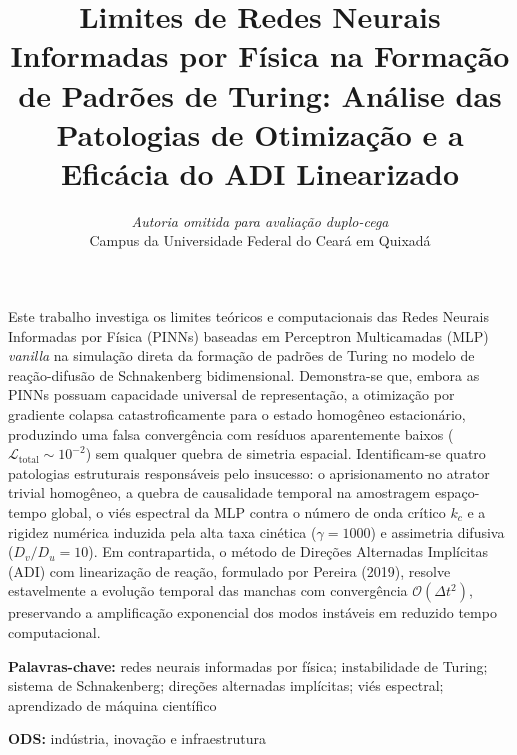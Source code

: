 \documentclass[a4paper, 12pt, twoside]{article}
\title{\textbf{Limites de Redes Neurais Informadas por Física na Formação de Padrões
       de Turing: Análise das Patologias de Otimização e a Eficácia do ADI Linearizado}}
\author{%
  \textit{Autoria omitida para avaliação duplo-cega}\\[0.2em]
  \small Campus da Universidade Federal do Ceará em Quixadá
}
\date{}
\renewcommand{\qabstract}[6]{%
  \vspace{0.35em}%
  \noindent{\normalfont\normalsize\bfseries\MakeUppercase{#1}}\par%
  \vspace{0.15em}%
  \noindent #4\par%
  \vspace{0.25em}%
  \noindent\textbf{#2:} #5\par%
  \vspace{0.15em}%
  \noindent\textbf{#3:} #6\par%
  \vspace{0.5em}%
}
\begin{document}
\maketitle
\thispagestyle{plain}


\qabstract{Resumo}{Palavras-chave}{ODS}{%
Este trabalho investiga os limites teóricos e computacionais das Redes Neurais
Informadas por Física (PINNs) baseadas em Perceptron Multicamadas (MLP) \textit{vanilla}
na simulação direta da formação de padrões de Turing no modelo de reação-difusão de
Schnakenberg bidimensional. Demonstra-se que, embora as PINNs possuam capacidade universal
de representação, a otimização por gradiente colapsa catastroficamente para o estado
homogêneo estacionário, produzindo uma falsa convergência com resíduos aparentemente
baixos ($\mathcal{L}_{\mathrm{total}} \sim 10^{-2}$) sem qualquer quebra de simetria espacial.
Identificam-se quatro patologias estruturais responsáveis pelo insucesso: o aprisionamento
no atrator trivial homogêneo, a quebra de causalidade temporal na amostragem espaço-tempo
global, o viés espectral da MLP contra o número de onda crítico $k_c$ e a rigidez numérica
induzida pela alta taxa cinética ($\gamma = 1000$) e assimetria difusiva ($D_v/D_u = 10$).
Em contrapartida, o método de Direções Alternadas Implícitas (ADI) com linearização de
reação, formulado por Pereira (2019), resolve estavelmente a evolução temporal das manchas
com convergência $\mathcal{O}(\Delta t^2)$, preservando a amplificação exponencial dos
modos instáveis em reduzido tempo computacional.%
}{%
redes neurais informadas por física; instabilidade de Turing; sistema de Schnakenberg;
direções alternadas implícitas; viés espectral; aprendizado de máquina científico%
}{%
indústria, inovação e infraestrutura%
}
\end{document}
